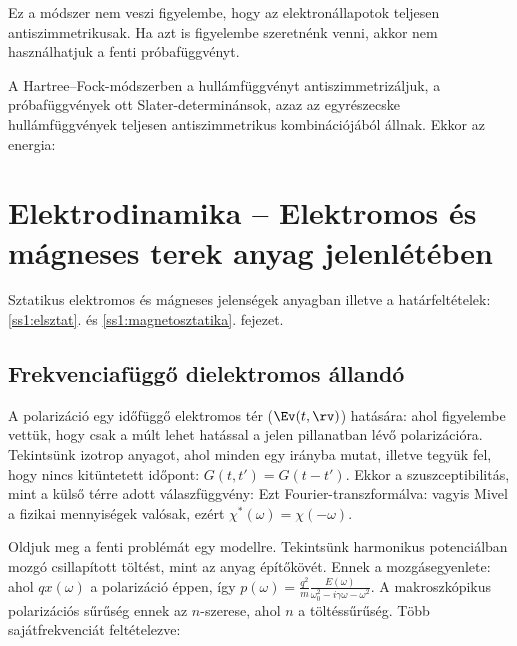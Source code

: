    Ez a módszer nem veszi figyelembe, hogy az elektronállapotok teljesen antiszimmetrikusak.
   Ha azt is figyelembe szeretnénk venni, akkor nem használhatjuk a fenti próbafüggvényt.
   
   A Hartree--Fock-módszerben a hullámfüggvényt antiszimmetrizáljuk, a próbafüggvények ott Sla\-ter-de\-ter\-mi\-nán\-sok, azaz az egyrészecske hullámfüggvények teljesen antiszimmetrikus kombinációjából állnak.
   Ekkor az energia:
   
 \section{Elektrodinamika -- Elektromos és mágneses terek anyag jelenlétében}
  
  Sztatikus elektromos és mágneses jelenségek anyagban illetve a határfeltételek: \ref{ss1:elsztat}. és \ref{ss1:magnetosztatika}. fejezet. 
  
  \subsection{Frekvenciafüggő dielektromos állandó}
   
   A polarizáció egy időfüggő elektromos tér ($\Ev(t,\rv)$) hatására:
   ahol figyelembe vettük, hogy csak a múlt lehet hatással a jelen pillanatban lévő polarizációra.
   Tekintsünk izotrop anyagot, ahol minden egy irányba mutat, illetve tegyük fel, hogy nincs kitüntetett időpont: $G(t,t')=G(t-t')$.
   Ekkor a szuszceptibilitás, mint a külső térre adott válaszfüggvény:
   Ezt Fourier-transzformálva:
   vagyis
   Mivel a fizikai mennyiségek valósak, ezért $\chi^*(\omega)=\chi(-\omega)$. 
   
   Oldjuk meg a fenti problémát egy modellre.
   Tekintsünk harmonikus potenciálban mozgó csillapított töltést, mint az anyag építőkövét.
   Ennek a mozgásegyenlete:
   ahol $qx(\omega)$ a polarizáció éppen, így $p(\omega)=\frac{q^2}{m}\frac{E(\omega)}{\omega_0^2-i\gamma\omega-\omega^2}$.
   A makroszkópikus polarizációs sűrűség ennek az $n$-szerese, ahol $n$ a töltéssűrűség.
   Több sajátfrekvenciát feltételezve:
   
